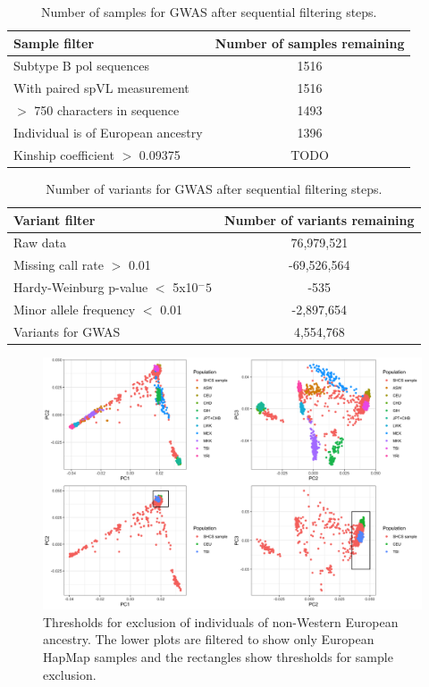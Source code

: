 \documentclass[]{article}
\begin{document}
\begin{doublespace}
\begin{table}[H]
    \begin{center}
    \begin{tabular}{lc}
    \hline
    Sample filter & Number of samples remaining \\
    \hline
    Subtype B pol sequences & 1516 \\
    With paired spVL measurement & 1516 \\
    $>$ 750 characters in sequence & 1493 \\
    Individual is of European ancestry & 1396 \\
    Kinship coefficient $>$ 0.09375 & TODO \\ 
    \hline
    \end{tabular}
    \caption{Number of samples for GWAS after sequential filtering steps.}
    \label{tab:sample-filtering}
    \end{center}
\end{table}

\begin{table}[H]
	\begin{center}
		\begin{tabular}{lc}
			\hline
			Variant filter & Number of variants remaining \\
			\hline 
			Raw data & 76,979,521 \\
			Missing call rate $>$ 0.01 & -69,526,564 \\
			Hardy-Weinburg p-value $<$ 5x10$^-5$ & -535 \\
			Minor allele frequency $<$ 0.01 & -2,897,654 \\
			Variants for GWAS & 4,554,768 \\ \hline			
		\end{tabular}
		\caption{Number of variants for GWAS after sequential filtering steps.}
		\label{tab:variant-filtering}
	\end{center}
\end{table}

\begin{figure}[H]
	\includegraphics[width=\linewidth]{figures/pca_plot}
	\caption{Thresholds for exclusion of individuals of non-Western European ancestry. The lower plots are filtered to show only European HapMap samples and the rectangles show thresholds for sample exclusion.}
	\label{fig:PCA}
\end{figure}


\end{doublespace}
\end{document}
